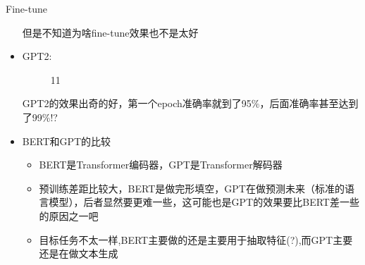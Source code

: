 \documentclass[UTF8]{ctexbeamer}
\begin{document}
\begin{frame}[allowframebreaks]{Fine-tune}
\begin{itemize}
		但是不知道为啥fine-tune效果也不是太好\newpage
		\item GPT2:
		\begin{figure}[H]
			\centering  %
			\caption{11}	
		\end{figure}
		GPT2的效果出奇的好，第一个epoch准确率就到了95\%，后面准确率甚至达到了99\%!?\newpage
		\item BERT和GPT的比较
		\begin{itemize}
			\item BERT是Transformer编码器，GPT是Transformer解码器
			\item 预训练差距比较大，BERT是做完形填空，GPT在做预测未来（标准的语言模型），后者显然要更难一些，这可能也是GPT的效果要比BERT差一些的原因之一吧
			\item 目标任务不太一样,BERT主要做的还是主要用于抽取特征(?),而GPT主要还是在做文本生成
		\end{itemize}
	\end{itemize}
\end{frame}
\end{document}
